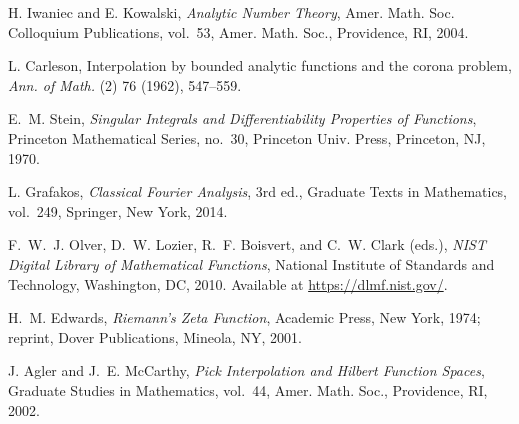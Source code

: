 \documentclass[11pt]{article}
\theoremstyle{definition}
\theoremstyle{remark}
\begin{document}
\begin{thebibliography}{99}
 H. Iwaniec and E. Kowalski, \emph{Analytic Number Theory}, Amer. Math. Soc. Colloquium Publications, vol.~53, Amer. Math. Soc., Providence, RI, 2004.




 L. Carleson, Interpolation by bounded analytic functions and the corona problem, \emph{Ann. of Math.} (2) 76 (1962), 547--559.




 E.~M. Stein, \emph{Singular Integrals and Differentiability Properties of Functions}, Princeton Mathematical Series, no.~30, Princeton Univ. Press, Princeton, NJ, 1970.




 L. Grafakos, \emph{Classical Fourier Analysis}, 3rd ed., Graduate Texts in Mathematics, vol.~249, Springer, New York, 2014.




 F.~W.~J. Olver, D.~W. Lozier, R.~F. Boisvert, and C.~W. Clark (eds.), \emph{NIST Digital Library of Mathematical Functions}, National Institute of Standards and Technology, Washington, DC, 2010. Available at \url{https://dlmf.nist.gov/}.




 H.~M. Edwards, \emph{Riemann's Zeta Function}, Academic Press, New York, 1974; reprint, Dover Publications, Mineola, NY, 2001.




 J. Agler and J.~E. McCarthy, \emph{Pick Interpolation and Hilbert Function Spaces}, Graduate Studies in Mathematics, vol.~44, Amer. Math. Soc., Providence, RI, 2002.



\end{thebibliography}
\end{document}
